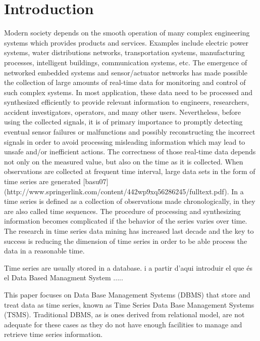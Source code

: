 \section{Introduction}



Modern society depends on the smooth operation of many complex
engineering systems which provides products and services. Examples
include electric power systems, water distributions networks,
transportation systems, manufacturing processes, intelligent
buildings, communication systems, etc. The emergence of networked
embedded systems and sensor/actuator networks has made possible the
collection of large amounts of real-time data for monitoring and
control of such complex systems.  In most application, these data need
to be processed and synthesized efficiently to provide relevant
information to engineers, researchers, accident investigators,
operators, and many other users. Nevertheless, before using the
collected signals, it is of primary importance to promptly detecting
eventual sensor failures or malfunctions and possibly reconstructing
the incorrect signals in order to avoid processing misleading
information which may lead to unsafe and/or inefficient actions. The
correctness of those real-time data depends not only on the measured
value, but also on the time as it is collected. When observations are
collected at frequent time interval, large data sets in the form of
time series are generated [basu07]
(http://www.springerlink.com/content/442wp9xq56286245/fulltext.pdf). In
\cite{fu11} a time series is defined as a collection of observations
made chronologically, in \cite{last:hetland} they are also called time
sequences.  The procedure of processing and synthesizing information
becomes complicated if the behavior of the series varies over time.
The research in time series data mining has increased last decade and
the key to success is reducing the dimension of time series in order
to be able process the data in a reasonable time.

Time series are usually stored in a database.     i a partir d'aqui introduir el que és el Data Based Managment System .....






This paper focuses on Data Base Management Systems (DBMS) that store
and treat data as time series, known as Time Series Data Base
Management Systems (TSMS). Traditional DBMS, as is ones derived from
relational model, are not adequate for these cases as they do not have
enough facilities to manage and retrieve time series information.

